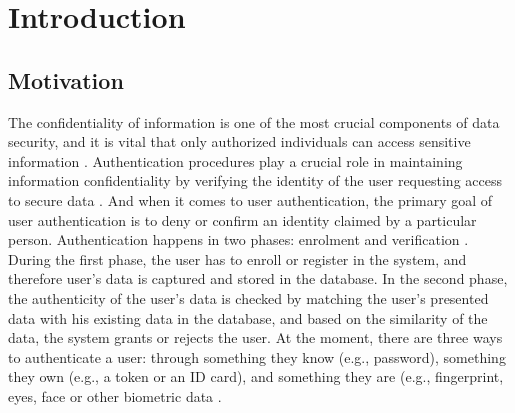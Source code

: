 \chapter{Introduction}
\label{ch:introduction}
\section{Motivation}
\label{sec:Introduction:Motivation}
The confidentiality of information is one of the most crucial components of data security, and it is vital that only authorized individuals can access sensitive information \cite{al2021ensuring}. Authentication procedures play a crucial role in maintaining information confidentiality by verifying the identity of the user requesting access to secure data \cite{jayarathne2016brainid}. And when it comes to user authentication, the primary goal of user authentication is to deny or confirm an identity claimed by a particular person. Authentication happens in two phases: enrolment and verification \cite{pham2013eeg}. During the first phase, the user has to enroll or register in the system, and therefore user's data is captured and stored in the database. In the second phase, the authenticity of the user's data is checked by matching the user's presented data with his existing data in the database, and based on the similarity of the data, the system grants or rejects the user. 
At the moment, there are three ways to authenticate a user: through something they know (e.g., password), something they own (e.g., a token or an ID card), and something they are (e.g., fingerprint, eyes, face or other biometric data \cite{grassi2017draft}. 
\smallskip


